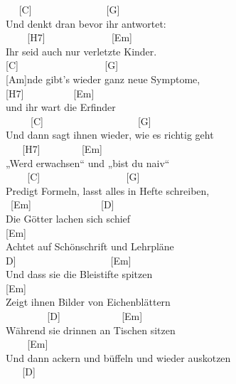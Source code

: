 \documentclass[
  letterpaper,
]{scrbook}
\begin{document}
~ ~{[}C{]} ~ ~ ~ ~ ~ ~ ~ ~ ~{[}G{]}\\
Und denkt dran bevor ihr antwortet:\\
\hspace*{0.333em} ~ ~ ~{[}H7{]} ~ ~ ~ ~ ~ ~ ~ ~{[}Em{]}\\
Ihr seid auch nur verletzte Kinder.\\
\hspace*{0.333em} {[}C{]} ~ ~ ~ ~ ~ ~ ~ ~ ~ ~ {[}G{]}\\
{[}Am{]}nde gibt's wieder ganz neue Symptome,\\
\hspace*{0.333em} {[}H7{]} ~ ~ ~ ~ ~ ~{[}Em{]}\\
und ihr wart die Erfinder\\
\hspace*{0.333em} ~ ~ ~ {[}C{]} ~ ~ ~ ~ ~ ~ ~ ~ ~ ~ ~ {[}G{]}\\
Und dann sagt ihnen wieder, wie es richtig geht\\
\hspace*{0.333em} ~ ~ {[}H7{]} ~ ~ ~ ~ ~{[}Em{]}\\
„Werd erwachsen`` und „bist du naiv``\\
\hspace*{0.333em} ~ ~ ~{[}C{]} ~ ~ ~ ~ ~ ~ ~ ~ ~ ~ {[}G{]}\\
Predigt Formeln, lasst alles in Hefte schreiben,\\
\hspace*{0.333em} ~{[}Em{]} ~ ~ ~ ~ ~ ~ ~ ~ {[}D{]}\\
Die Götter lachen sich schief\\
{[}Em{]}\\
Achtet auf Schönschrift und Lehrpläne\\
\hspace*{0.333em}{[}D{]} ~ ~ ~ ~ ~ ~ ~ ~ ~ ~ ~ {[}Em{]}\\
Und dass sie die Bleistifte spitzen\\
{[}Em{]} ~ ~ ~ ~ ~ ~ ~\\
Zeigt ihnen Bilder von Eichenblättern\\
\hspace*{0.333em} ~ ~ ~ ~ ~ {[}D{]} ~ ~ ~ ~ ~ ~ ~ {[}Em{]}\\
Während sie drinnen an Tischen sitzen\\
\hspace*{0.333em} ~ ~ ~{[}Em{]}\\
Und dann ackern und büffeln und wieder auskotzen\\
\hspace*{0.333em} ~ ~ {[}D{]}\\
\end{document}
